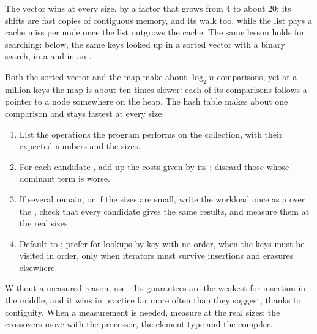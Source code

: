 The vector wins at every size, by a factor that grows from 4 to about 20: its shifts are fast copies of
contiguous memory, and its walk too, while the list pays a cache miss per node once the list outgrows the cache.
The same lesson holds for searching: below, the same keys looked up in a sorted vector with a binary search, in a
 and in an .

\label{out:b2:cpp-standard-library:lookups}

Both the sorted vector and the map make about $\log_2 n$ comparisons, yet at a million keys the map is about ten
times slower: each of its comparisons follows a pointer to a node somewhere on the heap. The hash table makes about
one comparison and stays fastest at every size.

\begin{method}\label{met:b2:cpp-standard-library:choose}
\begin{enumerate}
\item List the operations the program performs on the collection, with their expected numbers and the sizes.
\item For each candidate , add up the costs given by its ; discard those whose
dominant term is worse.
\item If several remain, or if the sizes are small, write the workload once as a  over the ,
check that every candidate gives the same results, and measure them at the real sizes.
\item Default to ; prefer  for lookups by key with no order,  when the
keys must be visited in order,  only when iterators must survive insertions and erasures elsewhere.
\end{enumerate}
\end{method}

\begin{inpractice}
Without a measured reason, use . Its guarantees are the weakest for insertion in the middle, and
it wins in practice far more often than they suggest, thanks to contiguity. When a measurement is needed, measure
at the real sizes: the crossovers move with the processor, the element type and the compiler.
\end{inpractice}


